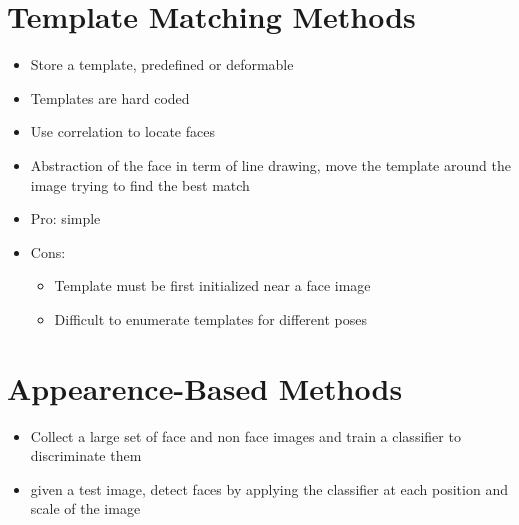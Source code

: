 \documentclass[12pt,oneside]{report}
\begin{document}
\section{Template Matching Methods}
\begin{itemize}
    \item Store a template, predefined or deformable
    \item Templates are hard coded
    \item Use correlation to locate faces
    \item Abstraction of the face in term of line drawing, move the template around the image trying to find the best match
    \item Pro: simple
    \item Cons:
    \begin{itemize}
        \item Template must be first initialized near a face image
        \item Difficult to enumerate templates for different poses
    \end{itemize}
\end{itemize}

\section{Appearence-Based Methods}
\begin{itemize}
    \item Collect a large set of face and non face images and train a classifier to discriminate them
    \item given a test image, detect faces by applying the classifier at each position and scale of the image
\end{itemize}
\end{document}
